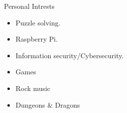 \documentclass{resume} %
\begin{document}
\begin{rSection}{Personal Intrests} %
    \begin{multicols}{3}
        \begin{itemize}
            \item Puzzle solving.
            \item Raspberry Pi.
            \item Information security/Cybersecurity.
            \item Games
            \item Rock music
            \item Dungeons \& Dragons
        \end{itemize}
        \end{multicols}


\end{rSection}



\end{document}
